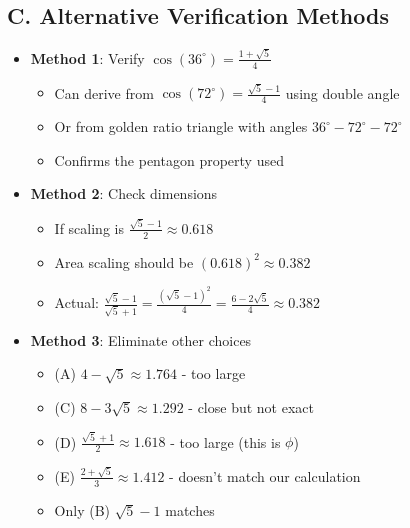 \documentclass[12pt]{article}
\begin{document}
\begin{verificationbox}
\subsection*{C. Alternative Verification Methods}
\begin{itemize}[leftmargin=*]
    \item \textbf{Method 1}: Verify $\cos(36^\circ) = \frac{1+\sqrt{5}}{4}$
    \begin{itemize}
        \item Can derive from $\cos(72^\circ) = \frac{\sqrt{5}-1}{4}$ using double angle
        \item Or from golden ratio triangle with angles $36^\circ-72^\circ-72^\circ$
        \item Confirms the pentagon property used
    \end{itemize}
    \item \textbf{Method 2}: Check dimensions
    \begin{itemize}
        \item If scaling is $\frac{\sqrt{5}-1}{2} \approx 0.618$
        \item Area scaling should be $(0.618)^2 \approx 0.382$
        \item Actual: $\frac{\sqrt{5}-1}{\sqrt{5}+1} = \frac{(\sqrt{5}-1)^2}{4} = \frac{6-2\sqrt{5}}{4} \approx 0.382$ \checkmark
    \end{itemize}
    \item \textbf{Method 3}: Eliminate other choices
    \begin{itemize}
        \item (A) $4-\sqrt{5} \approx 1.764$ - too large
        \item (C) $8-3\sqrt{5} \approx 1.292$ - close but not exact
        \item (D) $\frac{\sqrt{5}+1}{2} \approx 1.618$ - too large (this is $\phi$)
        \item (E) $\frac{2+\sqrt{5}}{3} \approx 1.412$ - doesn't match our calculation
        \item Only (B) $\sqrt{5}-1$ matches
    \end{itemize}
\end{itemize}
\end{verificationbox}
\end{document}
